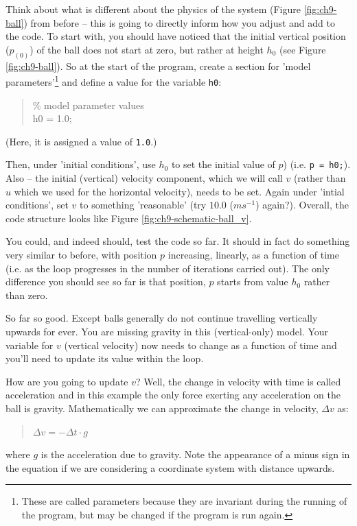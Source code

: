 \documentclass{tufte-book} %
\newenvironment{docspec}{\begin{quotation}\ttfamily\parskip0pt\parindent0pt\ignorespaces}{\end{quotation}}
\begin{document}
\vspace{1mm}

Think about what is different about the physics of the system (Figure \ref{fig:ch9-ball}) from before -- this is going to directly inform how you adjust and add to the code. To start with, you should have noticed that the initial vertical position (\(p_{(0)}\)) of the ball does not start at zero, but rather at height \(h_{0}\) (see Figure \ref{fig:ch9-ball}). So at the start of the program, create a section for 'model parameters'\footnote{These are called parameters because they are invariant during the running of the program, but may be changed if the program is run again.} and define a value for the variable \texttt{h0}:
\vspace{-1mm}\begin{docspec}
\textcolor[rgb]{0,0.501961,0}{\% model parameter values}\\
h0 = 1.0;\\
\end{docspec}\vspace{-1mm}
(Here, it is assigned a value of \texttt{1.0}.)

Then, under 'initial conditions', use \(h_{0}\) to set the initial value of \(p\)) (i.e. \texttt{p = h0;}). Also -- the initial (vertical) velocity component, which we will call \(v\) (rather than \(u\) which we used for the horizontal velocity), needs to be set. Again under 'intial conditions', set \(v\) to something 'reasonable' (try \(10.0\) (\(ms^{-1}\)) again?). Overall, the code structure looks like Figure \ref{fig:ch9-schematic-ball_v}.

You could, and indeed should, test the code so far. It should in fact do something very similar to before, with position \(p\) increasing, linearly, as a function of time (i.e. as the loop progresses in the number of iterations carried out). The only difference you should see so far is that position, \(p\) starts from value \(h_{0}\) rather than zero.

\vspace{1mm}

So far so good. Except balls generally do not continue travelling vertically upwards for ever. You are missing gravity in this (vertical-only) model. Your variable for \(v\) (vertical velocity) now needs to change as a function of time and you'll need to update its value within the loop.

How are you going to update \(v\)? Well, the change in velocity with time is called acceleration and in this example the only force exerting any acceleration on the ball is gravity. Mathematically we can approximate the change in velocity, \(\Delta v\) as:
\begin{docspec}
\(\Delta v=-\Delta t\cdot g\)
\end{docspec}
where \(g\) is the acceleration due to gravity. Note the appearance of a minus sign in the equation if we are considering a coordinate system with distance upwards.
\end{document}
